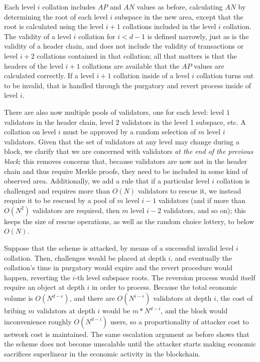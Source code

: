 \documentclass[11pt,a4paper]{article}
\theoremstyle{plain}
\theoremstyle{definition}
\theoremstyle{remark}
\begin{document}
Each level $i$ collation includes $AP$ and $AN$ values as before, calculating $AN$ by determining the root of each level $i$ subspace in the new area, except that the root is calculated using the level $i+1$ collations included in the level $i$ collation. The validity of a level $i$ collation for $i < d-1$ is defined narrowly, just as is the validity of a header chain, and does not include the validity of transactions or level $i+2$ collations contained in that collation; all that matters is that the headers of the level $i+1$ collations are available that the $AP$ values are calculated correctly. If a level $i+1$ collation inside of a level $i$ collation turns out to be invalid, that is handled through the purgatory and revert process inside of level $i$.

There are also now multiple pools of validators, one for each level: level $1$ validators in the header chain, level $2$ validators in the level 1 subspace, etc. A collation on level $i$ must be approved by a random selection of $m$ level $i$ validators. Given that the set of validators at any level may change during a block, we clarify that we are concerned with validators \emph{at the end of the previous block}; this removes concerns that, because validators are now not in the header chain and thus require Merkle proofs, they need to be included in some kind of observed area. Additionally, we add a rule that if a particular level $i$ collation is challenged and requires more than $O(N)$ validators to rescue it, we instead require it to be rescued by a pool of $m$ level $i-1$ validators (and if more than $O(N^2)$ validators are required, then $m$ level $i-2$ validators, and so on); this keeps the size of rescue operations, as well as the random choice lottery, to below $O(N)$. 

Suppose that the scheme is attacked, by means of a successful invalid level $i$ collation. Then, challenges would be placed at depth $i$, and eventually the collation's time in purgatory would expire and the revert procedure would happen, reverting the $i$-th level subspace roots. The reversion process would itself require an object at depth $i$ in order to process. Because the total economic volume is $O(N^{d-\epsilon})$, and there are $O(N^{i-\epsilon})$ validators at depth $i$, the cost of bribing $m$ validators at depth $i$ would be $m * N^{d - i}$, and the block would inconvenience roughly $O(N^{d - i})$ users, so a proportionality of attacker cost to network cost is maintained. The same escalation argument as before shows that the scheme does not become unscalable until the attacker starts making economic sacrifices superlinear in the economic activity in the blockchain.
\end{document}
